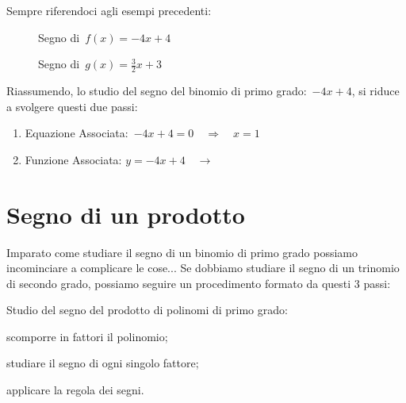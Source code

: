 Sempre riferendoci agli esempi precedenti:

\begin{inaccessibleblock}
 \begin{figure}[h]
 \centering
 \begin{minipage}[]{.45\textwidth}
  \centering
  \caption{Segno di~$f(x) = -4 x +4$}
 \end{minipage}
 \begin{minipage}[]{.45\textwidth}
  \centering
  \caption{Segno di~$g(x) = \frac{3}{2} x +3$}
 \end{minipage}
\end{figure}
\end{inaccessibleblock}

Riassumendo, lo studio del segno del binomio di primo grado:~$-4 x +4$,  
si riduce a svolgere questi due passi:

\begin{enumerate}
 \item
  Equazione Associata:~$-4 x +4 = 0 \quad \Rightarrow \quad x = 1$
 \item 
  \begin{minipage}{.45\textwidth}
  Funzione Associata: $y = -4 x +4 \quad \rightarrow$
  \end{minipage}
  \begin{minipage}{.30\textwidth}
  
  \end{minipage}
\end{enumerate}

\section{Segno di un prodotto}
\label{sec:dis_prodotto}

Imparato come studiare il segno di un binomio di primo grado possiamo 
incominciare a complicare le cose...
Se dobbiamo studiare il segno di un trinomio di secondo grado, possiamo 
seguire un procedimento formato da questi 3 passi:

\begin{procedura}
 Studio del segno del prodotto di polinomi di primo grado:
\begin{enumeratea}
\item scomporre in fattori il polinomio;
\item studiare il segno di ogni singolo fattore;
\item applicare la regola dei segni.
\end{enumeratea}
\end{procedura}

